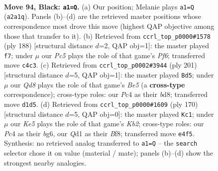 \documentclass[11pt]{article}
\begin{document}
\clearpage

\begin{figure}[p]\centering
\begin{subfigure}{0.46\textwidth}\centering
\resizebox{\linewidth}{!}{%
\newchessgame
\chessboard[
  setfen={8/8/8/8/2p1k3/8/p5K1/3q4 b - - 1 94},
  showmover=false,
  pgfstyle=straightmove, color=movearrow, markmove={a2-a1}
]}
\caption{}
\end{subfigure}\hfill
\begin{subfigure}{0.46\textwidth}\centering
\resizebox{\linewidth}{!}{%
\newchessgame
\chessboard[
  setfen={4Q3/8/5P2/3k4/8/6K1/8/8 w - - 0 95},
  showmover=false,
  pgfstyle=straightmove, color=movearrow, markmove={f6-f7}
]}
\caption{}
\end{subfigure}
\\[4pt]
\begin{subfigure}{0.46\textwidth}\centering
\resizebox{\linewidth}{!}{%
\newchessgame
\chessboard[
  setfen={3B4/8/3k4/7p/4bp2/8/8/6K1 b - - 49 101},
  showmover=false,
  pgfstyle=straightmove, color=movearrow, markmove={e4-d5}
]}
\caption{}
\end{subfigure}\hfill
\begin{subfigure}{0.46\textwidth}\centering
\resizebox{\linewidth}{!}{%
\newchessgame
\chessboard[
  setfen={5B2/3k4/6b1/6P1/8/8/1K6/8 w - - 3 86},
  showmover=false,
  pgfstyle=straightmove, color=movearrow, markmove={b2-c1}
]}
\caption{}
\end{subfigure}
\caption{\textbf{Move 94, Black: \texttt{a1=Q}.} (a) Our position; Melanie plays \texttt{a1=Q} (\texttt{a2a1q}). Panels (b)--(d) are the retrieved master positions whose correspondence most drove this move (highest QAP objective among those that transfer to it). (b) Retrieved from \texttt{ccrl\_top\_p0000\#1578} (ply 188) [structural distance $d$=2, QAP obj=1]: the master played \texttt{f7}; under $\mu$ our \emph{Pc5} plays the role of that game's \emph{Pf6}; transferred move \texttt{c4c3}. (c) Retrieved from \texttt{ccrl\_top\_p0002\#3944} (ply 201) [structural distance $d$=5, QAP obj=1]: the master played \texttt{Bd5}; under $\mu$ our \emph{Qd8} plays the role of that game's \emph{Be5} (a \textbf{cross-type} correspondence); cross-type roles: our \emph{P}c4 as their \emph{b}d8; transferred move \texttt{d1d5}. (d) Retrieved from \texttt{ccrl\_top\_p0000\#1609} (ply 170) [structural distance $d$=5, QAP obj=0]: the master played \texttt{Kc1}; under $\mu$ our \emph{Ke5} plays the role of that game's \emph{Kb2}; cross-type roles: our \emph{P}c4 as their \emph{b}g6, our \emph{Q}d1 as their \emph{B}f8; transferred move \texttt{e4f5}. Synthesis: no retrieved analog transferred to \texttt{a1=Q} -- the \texttt{search} selector chose it on value (material / mate); panels (b)--(d) show the strongest nearby analogies.}
\label{fig:thought-m187}
\end{figure}
\end{document}
